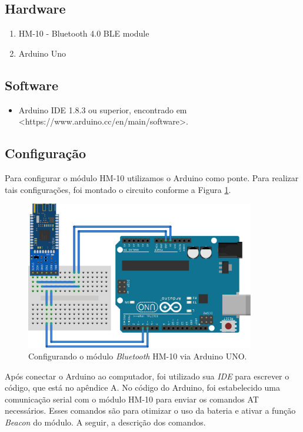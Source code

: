 \documentclass[
	12pt,				%
	oneside,			%
	a4paper,			%
	brazil				%
]{abntex2}
\begin{document}
\subsection{Hardware}

\begin{enumerate}
\item HM-10 - Bluetooth 4.0 BLE module
\item Arduino Uno
\end{enumerate}

\subsection{Software}

\begin{itemize}
\item Arduino IDE 1.8.3 ou superior, encontrado em <https://www.arduino.cc/en/main/software>. 
\end{itemize}

\subsection{Configuração}

Para configurar o módulo HM-10 utilizamos o Arduino como ponte. Para realizar tais configurações, foi montado o circuito conforme a Figura \ref{beacon}.

\begin{figure}[!h]
\centering
\includegraphics[width=10cm, center]{images/arduino-hm10}
\caption{Configurando o módulo \textit{Bluetooth} HM-10 via Arduino UNO.}
\label{beacon}
\end{figure}

Após conectar o Arduino ao computador, foi utilizado sua \textit{IDE} para escrever o código, que está no apêndice A. No código do Arduino, foi estabelecido uma comunicação serial com o módulo HM-10 para enviar os comandos AT necessários. Esses comandos são para otimizar o uso da bateria e ativar a função \textit{Beacon} do módulo. A seguir, a descrição dos comandos.
\end{document}
